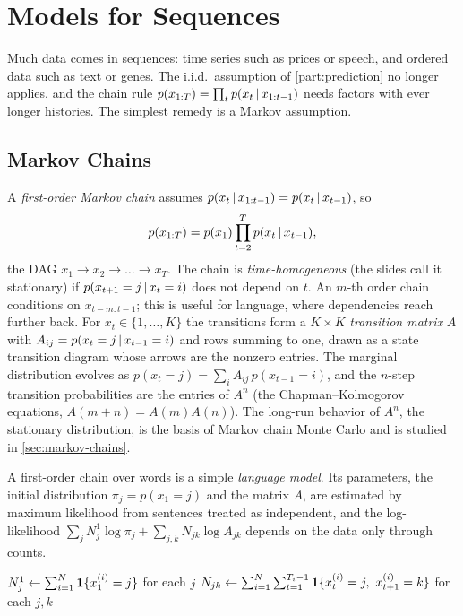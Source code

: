 \section{Models for Sequences}\label{sec:pgm-sequences}

Much data comes in sequences: time series such as prices or speech, and ordered data such as text or genes. The i.i.d.\ assumption of \cref{part:prediction} no longer applies, and the chain rule $p(x_{1:T})=\prod_tp(x_t\,|\, x_{1:t-1})$ needs factors with ever longer histories. The simplest remedy is a Markov assumption.

\subsection{Markov Chains}

A \emph{first-order Markov chain} assumes $p(x_t\,|\, x_{1:t-1})=p(x_t\,|\, x_{t-1})$, so
\[
p(x_{1:T})=p(x_1)\prod_{t=2}^Tp(x_t\,|\, x_{t-1}),
\]
the DAG $x_1\to x_2\to\dots\to x_T$. The chain is \emph{time-homogeneous} (the slides call it stationary) if $p(x_{t+1}=j\,|\, x_t=i)$ does not depend on $t$. An $m$-th order chain conditions on $x_{t-m:t-1}$; this is useful for language, where dependencies reach further back. For $x_t\in\{1,\dots,K\}$ the transitions form a $K\times K$ \emph{transition matrix} $A$ with $A_{ij}=p(x_t=j\,|\, x_{t-1}=i)$ and rows summing to one, drawn as a state transition diagram whose arrows are the nonzero entries. The marginal distribution evolves as $p(x_t=j)=\sum_iA_{ij}\,p(x_{t-1}=i)$, and the $n$-step transition probabilities are the entries of $A^n$ (the Chapman--Kolmogorov equations, $A(m+n)=A(m)A(n)$). The long-run behavior of $A^n$, the stationary distribution, is the basis of Markov chain Monte Carlo and is studied in \cref{sec:markov-chains}.

A first-order chain over words is a simple \emph{language model}. Its parameters, the initial distribution $\pi_j=p(x_1=j)$ and the matrix $A$, are estimated by maximum likelihood from sentences treated as independent, and the log-likelihood $\sum_jN_j^1\log\pi_j+\sum_{j,k}N_{jk}\log A_{jk}$ depends on the data only through counts.

\begin{algorithm}[H]
\caption{Maximum Likelihood for a Markov Chain (Bigram Language Model)}\label{alg:markov-mle}
\begin{algorithmic}[1]
\State $N_j^1\gets\sum_{i=1}^N\mathbf{1}\{x^{(i)}_1=j\}$ for each $j$ 
\State $N_{jk}\gets\sum_{i=1}^N\sum_{t=1}^{T_i-1}\ind\{x^{(i)}_t=j,\ x^{(i)}_{t+1}=k\}$ for each $j,k$ 
\end{algorithmic}
\end{algorithm}

